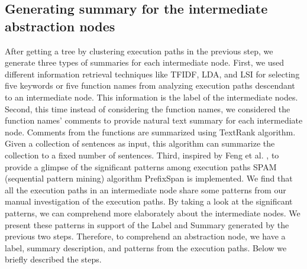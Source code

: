 \subsection{Generating summary for the intermediate abstraction nodes}
After getting a tree by clustering execution paths in the previous step,  
we generate three types of summaries for each intermediate node. First, we used different 
information retrieval techniques like TFIDF, LDA, and LSI for selecting five keywords or five function names from analyzing execution paths descendant to an intermediate node. This information is the label of the intermediate nodes. Second, this time instead of considering the function names, we considered the function names' comments to provide natural text summary for each intermediate node. Comments from the functions are summarized using TextRank \cite{barrios2016variationsTextRankSummarization} algorithm. Given a collection of sentences as input, this algorithm can summarize the collection to a fixed number of sentences. Third, inspired by Feng et al. \cite{feng2018hierarchicalExecutionComprehension}, to provide a glimpse of the significant patterns among execution paths SPAM (sequential pattern mining) algorithm PrefixSpan \cite{han2001prefixspanSequentialPatterns} is implemented. We find that all the execution paths in an intermediate node share some patterns from our manual investigation of the execution paths. By taking a look at the significant patterns, we can comprehend more elaborately about the intermediate nodes. We present these patterns in support of the Label and Summary generated by the previous two steps. Therefore, to comprehend an abstraction node, we have a label, summary description, and patterns from the execution paths. Below we briefly described the steps. 

